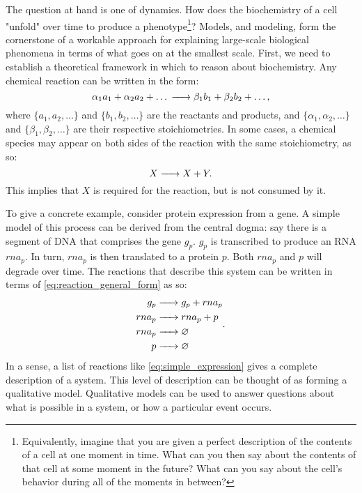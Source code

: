 The question at hand is one of dynamics. How does the biochemistry of a cell "unfold" over time to produce a phenotype\footnote{Equivalently, imagine that you are given a perfect description of the contents of a cell at one moment in time. What can you then say about the contents of that cell at some moment in the future? What can you say about the cell's behavior during all of the moments in between?}? Models, and modeling, form the cornerstone of a workable approach for explaining large-scale biological phenomena in terms of what goes on at the smallest scale. First, we need to establish a theoretical framework in which to reason about biochemistry. Any chemical reaction can be written in the form:
\begin{equation}\label{eq:reaction_general_form}
	\alpha_1 a_1 + \alpha_2 a_2 + \ldots \ce{->} \beta_1 b_1 + \beta_2 b_2 + \ldots,
\end{equation}  
where $\{a_1, a_2, \ldots \}$ and $\{b_1, b_2, \ldots \}$ are the reactants and products, and $\{\alpha_1, \alpha_2, \ldots \}$ and $\{\beta_1, \beta_2, \ldots \}$ are their respective stoichiometries. In some cases, a chemical species may appear on both sides of the reaction with the same stoichiometry, as so:
\begin{equation*}
    X \ce{->} X + Y.
\end{equation*}
This implies that $X$ is required for the reaction, but is not consumed by it.

To give a concrete example, consider protein expression from a gene. A simple model of this process can be derived from the central dogma\supercite{Crick:1958ws,Crick:1970wb}: say there is a segment of DNA that comprises the gene $g_p$. $g_p$ is transcribed to produce an RNA $rna_p$. In turn, $rna_p$ is then translated to a protein $p$. Both $rna_p$ and $p$ will degrade over time. The reactions that describe this system can be written in terms of \eqref{eq:reaction_general_form} as so:
\begin{align}\label{eq:simple_expression}
    \begin{split}
        g_p &\ce{->} g_p + rna_p \\
        rna_p &\ce{->} rna_p + p \\
        rna_p &\ce{->} \varnothing \\
        p &\ce{->} \varnothing
    \end{split}.
\end{align}
In a sense, a list of reactions like \eqref{eq:simple_expression} gives a complete description of a system. This level of description can be thought of as forming a qualitative model. Qualitative models can be used to answer questions about what is possible in a system, or how a particular event occurs.

